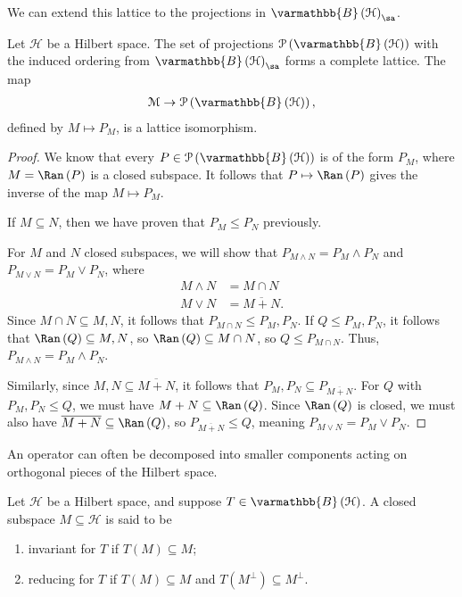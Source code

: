 \documentclass[10pt]{mypackage}
\renewcommand*{\mathbb}[1]{\varmathbb{#1}}
\newcommand{\B}{\mathbb{B}}
\begin{document}
We can extend this lattice to the projections in $\B\left(\mathcal{H}\right)_{\sa}$.
\begin{proposition}
  Let $\mathcal{H}$ be a Hilbert space. The set of projections $\mathcal{P}\left(\B\left(\mathcal{H}\right)\right)$ with the induced ordering from $\B\left(\mathcal{H}\right)_{\sa}$ forms a complete lattice. The map
  \begin{align*}
    \mathcal{M}\rightarrow \mathcal{P}\left(\B\left(\mathcal{H}\right)\right),
  \end{align*}
  defined by $M\mapsto P_M$, is a lattice isomorphism.
\end{proposition}
\begin{proof}
  We know that every $P\in \mathcal{P}\left(\B\left(\mathcal{H}\right)\right)$ is of the form $P_M$, where $M = \Ran\left(P\right)$ is a closed subspace. It follows that $P\mapsto \Ran\left(P\right)$ gives the inverse of the map $M\mapsto P_M$.\newline

  If $M\subseteq N$, then we have proven that $P_M\leq P_N$ previously.\newline

  For $M$ and $N$ closed subspaces, we will show that $P_{M\wedge N} = P_M\wedge P_N$ and $P_{M\vee N} = P_M\vee P_N$, where
  \begin{align*}
    M\wedge N &= M\cap N\\
    M\vee N &= \overline{M+N}.
  \end{align*}
  Since $M\cap N\subseteq M,N$, it follows that $P_{M\cap N}\leq P_M,P_N$. If $Q\leq P_{M},P_N$, it follows that $\Ran\left(Q\right)\subseteq M,N$, so $\Ran\left(Q\right)\subseteq M\cap N$, so $Q\leq P_{M\cap N}$. Thus, $P_{M\wedge N} = P_M\wedge P_N$.\newline

  Similarly, since $M,N\subseteq \overline{M+N}$, it follows that $P_M,P_N\subseteq P_{\overline{M+N}}$. For $Q$ with $P_M,P_N\leq Q$, we must have $M+N\subseteq \Ran\left(Q\right)$. Since $\Ran\left(Q\right)$ is closed, we must also have $\overline{M+N}\subseteq \Ran\left(Q\right)$, so $P_{\overline{M+N}}\leq Q$, meaning $P_{M\vee N} = P_{M}\vee P_N$.
\end{proof}
An operator can often be decomposed into smaller components acting on orthogonal pieces of the Hilbert space.
\begin{definition}
  Let $\mathcal{H}$ be a Hilbert space, and suppose $T\in \B\left(\mathcal{H}\right)$. A closed subspace $M\subseteq \mathcal{H}$ is said to be
  \begin{enumerate}[(1)]
    \item invariant for $T$ if $T\left(M\right)\subseteq M$;
    \item reducing for $T$ if $T\left(M\right)\subseteq M$ and $T\left(M^{\perp}\right) \subseteq M^{\perp}$.
  \end{enumerate}
\end{definition}
\end{document}
